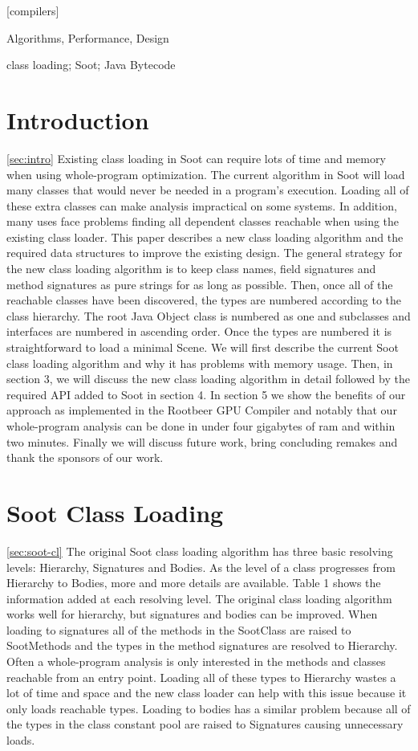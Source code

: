 \documentclass[preprint]{sigplanconf}
\begin{document}
[compilers]

\terms
Algorithms, Performance, Design

\keywords
class loading; Soot; Java Bytecode

\section{Introduction}
\ref{sec:intro}
Existing class loading in Soot \cite{soot-retro, soot-orig} can require lots of time and memory when using whole-program optimization. The current algorithm in Soot will load many classes that would never be needed in a program's execution. Loading all of these extra classes can make analysis impractical on some systems. In addition, many uses face problems finding all dependent classes reachable when using the existing class loader. This paper describes a new class loading algorithm and the required data structures to improve the existing design. The general strategy for the new class loading algorithm is to keep class names, field signatures and method signatures as pure strings for as long as possible. Then, once all of the reachable classes have been discovered, the types are numbered according to the class hierarchy. The root Java Object class is numbered as one and subclasses and interfaces are numbered in ascending order. Once the types are numbered it is straightforward to load a minimal Scene. We will first describe the current Soot class loading algorithm and why it has problems with memory usage. Then, in section 3, we will discuss the new class loading algorithm in detail followed by the required API added to Soot in section 4. In section 5 we show the benefits of our approach as implemented in the Rootbeer GPU Compiler\cite{rootbeer} and notably that our whole-program analysis can be done in under four gigabytes of ram and within two minutes. Finally we will discuss future work, bring concluding remakes and thank the sponsors of our work.

\section{Soot Class Loading}
\ref{sec:soot-cl}
The original Soot class loading algorithm has three basic resolving levels: Hierarchy, Signatures and Bodies. As the level of a class progresses from Hierarchy to Bodies, more and more details are available. Table 1 shows the information added at each resolving level. The original class loading algorithm works well for hierarchy, but signatures and bodies can be improved. When loading to signatures all of the methods in the SootClass are raised to SootMethods and the types in the method signatures are resolved to Hierarchy. Often a whole-program analysis is only interested in the methods and classes reachable from an entry point. Loading all of these types to Hierarchy wastes a lot of time and space and the new class loader can help with this issue because it only loads reachable types. Loading to bodies has a similar problem because all of the types in the class constant pool are raised to Signatures causing unnecessary loads.
\end{document}
